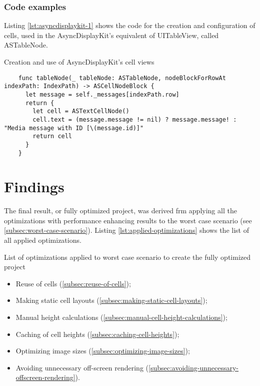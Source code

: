 \documentclass[a4paper,12pt]{article}
\begin{document}
\subsubsection{Code examples}
Listing \ref{lst:asyncdisplaykit-1} shows the code for the creation and configuration of cells, used in the AsyncDisplayKit's equivalent of UITableView, called ASTableNode.
\begin{listing}[H]
  \caption{Creation and use of AsyncDisplayKit's cell views}
  \label{lst:asyncdisplaykit-1}
  \begin{verbatim}
    func tableNode(_ tableNode: ASTableNode, nodeBlockForRowAt indexPath: IndexPath) -> ASCellNodeBlock {
      let message = self._messages[indexPath.row]
      return {
        let cell = ASTextCellNode()
        cell.text = (message.message != nil) ? message.message! : "Media message with ID [\(message.id)]"
        return cell
      }
    }
  \end{verbatim}
\end{listing}

\section{Findings}
The final result, or fully optimized project, was derived frm applying all the optimizations with performance enhancing results to the worst case scenario (see \autoref{subsec:worst-case-scenario}). Listing \ref{lst:applied-optimizations} shows the list of all applied optimizations.

\vspace{1.5em} %
\begin{listing}[H]
  \caption{List of optimizations applied to worst case scenario to create the fully optimized project}
  \label{lst:applied-optimizations}
  \begin{itemize}
    \item Reuse of cells (\autoref{subsec:reuse-of-cells});
    \item Making static cell layouts (\autoref{subsec:making-static-cell-layouts});
    \item Manual height calculations (\autoref{subsec:manual-cell-height-calculations});
    \item Caching of cell heights (\autoref{subsec:caching-cell-heights});
    \item Optimizing image sizes (\autoref{subsec:optimizing-image-sizes});
    \item Avoiding unnecessary off-screen rendering (\autoref{subsec:avoiding-unnecessary-offscreen-rendering}).
  \end{itemize}
\end{listing}
\end{document}
